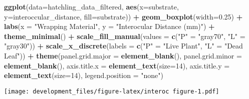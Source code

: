 \documentclass[
]{article}
\newenvironment{Shaded}{\begin{snugshade}}{\end{snugshade}}
\newcommand{\AttributeTok}[1]{\textcolor[rgb]{0.13,0.29,0.53}{#1}}
\newcommand{\DecValTok}[1]{\textcolor[rgb]{0.00,0.00,0.81}{#1}}
\newcommand{\FloatTok}[1]{\textcolor[rgb]{0.00,0.00,0.81}{#1}}
\newcommand{\FunctionTok}[1]{\textcolor[rgb]{0.13,0.29,0.53}{\textbf{#1}}}
\newcommand{\NormalTok}[1]{#1}
\newcommand{\OtherTok}[1]{\textcolor[rgb]{0.56,0.35,0.01}{#1}}
\newcommand{\SpecialCharTok}[1]{\textcolor[rgb]{0.81,0.36,0.00}{\textbf{#1}}}
\newcommand{\StringTok}[1]{\textcolor[rgb]{0.31,0.60,0.02}{#1}}
\begin{document}
\begin{Shaded}
\begin{Highlighting}[]
\FunctionTok{ggplot}\NormalTok{(}\AttributeTok{data=}\NormalTok{hatchling\_data\_filtered, }\FunctionTok{aes}\NormalTok{(}\AttributeTok{x=}\NormalTok{substrate, }\AttributeTok{y=}\NormalTok{interoccular\_distance, }\AttributeTok{fill=}\NormalTok{substrate)) }\SpecialCharTok{+}
  \FunctionTok{geom\_boxplot}\NormalTok{(}\AttributeTok{width=}\FloatTok{0.25}\NormalTok{) }\SpecialCharTok{+}
  \FunctionTok{labs}\NormalTok{(}\AttributeTok{x =} \StringTok{"Wrapping Material"}\NormalTok{, }\AttributeTok{y =} \StringTok{"Interocular Distance (mm)"}\NormalTok{) }\SpecialCharTok{+}
  \FunctionTok{theme\_minimal}\NormalTok{() }\SpecialCharTok{+}
  \FunctionTok{scale\_fill\_manual}\NormalTok{(}\AttributeTok{values =} \FunctionTok{c}\NormalTok{(}\StringTok{"P"} \OtherTok{=} \StringTok{"gray70"}\NormalTok{, }\StringTok{"L"} \OtherTok{=} \StringTok{"gray30"}\NormalTok{)) }\SpecialCharTok{+} 
  \FunctionTok{scale\_x\_discrete}\NormalTok{(}\AttributeTok{labels =} \FunctionTok{c}\NormalTok{(}\StringTok{"P"} \OtherTok{=} \StringTok{"Live Plant"}\NormalTok{, }\StringTok{"L"} \OtherTok{=} \StringTok{"Dead Leaf"}\NormalTok{)) }\SpecialCharTok{+}
  \FunctionTok{theme}\NormalTok{(}\AttributeTok{panel.grid.major =} \FunctionTok{element\_blank}\NormalTok{(),}
        \AttributeTok{panel.grid.minor =} \FunctionTok{element\_blank}\NormalTok{(),}
        \AttributeTok{axis.title.x =} \FunctionTok{element\_text}\NormalTok{(}\AttributeTok{size=}\DecValTok{14}\NormalTok{),}
        \AttributeTok{axis.title.y =} \FunctionTok{element\_text}\NormalTok{(}\AttributeTok{size=}\DecValTok{14}\NormalTok{),}
        \AttributeTok{legend.position =} \StringTok{"none"}\NormalTok{)}
\end{Highlighting}
\end{Shaded}

\texttt{[image: development\_files/figure-latex/interoc figure-1.pdf]}
\end{document}
